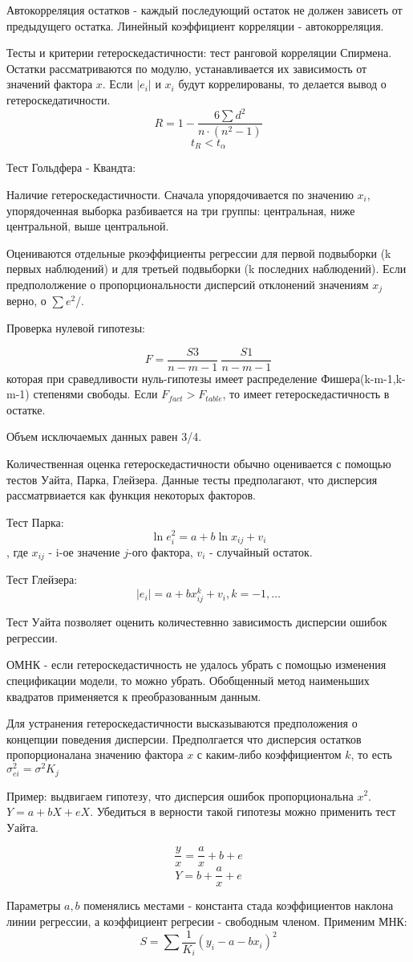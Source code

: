 \documentclass[aps,%
12pt,%
final,%
oneside,
onecolumn,%
musixtex, %
superscriptaddress,%
centertags]{article} %
\begin{document}
Автокорреляция остатков - каждый последующий остаток не должен зависеть от предыдущего остатка. Линейный коэффициент корреляции - автокорреляция.

Тесты и критерии гетероскедастичности: тест ранговой корреляции Спирмена. Остатки рассматриваются по модулю, устанавливается их зависимость от значений фактора $x$. Если $|e_i|$ и $x_i$ будут коррелированы, то делается вывод о гетероскедатичности.
$$ R = 1 - \frac{6\sum d^2}{n \cdot (n^2 - 1)}$$
$$t_R < t_{\alpha}$$

Тест Гольдфера - Квандта:

Наличие гетероскедастичности. Сначала упорядочивается по значению $x_i$, упорядоченная выборка разбивается на три группы: центральная, ниже центральной, выше центральной.

Оцениваются отдельные ркоэффициенты регрессии для первой подвыборки (k первых наблюдений) и для третьей подвыборки (k последних наблюдений). Если предпололжение о пропорциональности дисперсий отклонений значениям $x_j $ верно, о $\sum e^2$/.

Проверка нулевой гипотезы:

$$ F = \frac{S3}{n-m-1} \ \frac{S1}{n-m-1}$$
которая при сраведливости нуль-гипотезы имеет распределение Фишера(k-m-1,k-m-1) степенями свободы.
Если $F_{fact} >F_{table}$, то имеет гетероскедастичность в остатке.

Объем исключаемых данных равен 3/4.

Количественная оценка гетероскедастичности обычно оценивается с помощью тестов Уайта, Парка, Глейзера.
Данные тесты предполагают, что дисперсия рассматрвиается как функция некоторых факторов.

Тест Парка:
$$\ln e_i^2 = a +b\ln x_{ij}+v_i$$, где $x_{ij}$ - i-ое значение $j$-ого фактора, $v_i$ - случайный остаток.

Тест Глейзера:
$$ |e_i| = a + bx_{ij}^k + v_i, k = -1, \ldots$$

Тест Уайта позволяет оценить количестевнно зависимость дисперсии ошибок регрессии.

ОМНК - если гетероскедастичность не удалось убрать с помощью изменения спецификации модели, то можно убрать. Обобщенный метод наименьших квадратов применяется к преобразованным данным.

Для устранения гетероскедастичности высказываются предположения о концепции поведения дисперсии. Предполгается что дисперсия остатков пропорционалана значению фактора $x$ с каким-либо коэффициентом $k$, то есть $\sigma_{ei}^2 = \sigma^2K_j$

Пример: выдвигаем гипотезу, что дисперсия ошибок пропорциональна $x^2$. $Y=a+bX+eX$. Убедиться в верности такой гипотезы можно применить тест Уайта.

$$\frac{y}{x} = \frac{a}{x} + b + e$$
$$Y = b +\frac{a}{x} + e$$

Параметры $a,b$ поменялись местами - константа стада коэффициентов наклона линии регрессии, а коэффициент регресии - свободным членом.
Применим МНК:
$$ S = \sum \frac{1}{K_i}(y_i - a - bx_i)^2$$
\end{document}
